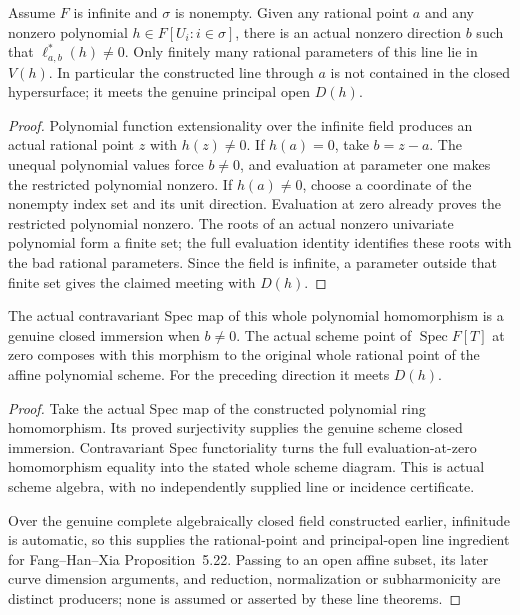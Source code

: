 \begin{theorem}
\label{algebra:affine-line-avoids-polynomial}
\leanok
{}
Assume $F$ is infinite and $\sigma$ is nonempty. Given any rational point
$a$ and any nonzero polynomial $h\in F[U_i:i\in\sigma]$, there is an
actual nonzero direction $b$ such that $\ell_{a,b}^*(h)\ne0$.
Only finitely many rational parameters of this line lie in $V(h)$.
In particular the constructed line through $a$ is not contained in the
closed hypersurface; it meets the genuine principal open $D(h)$.
\end{theorem}
\begin{proof}
Polynomial function extensionality over the infinite field produces an
actual rational point $z$ with $h(z)\ne0$. If $h(a)=0$, take $b=z-a$.
The unequal polynomial values force $b\ne0$, and evaluation at parameter
one makes the restricted polynomial nonzero. If $h(a)\ne0$, choose a
coordinate of the nonempty index set and its unit direction. Evaluation
at zero already proves the restricted polynomial nonzero. The roots of
an actual nonzero univariate polynomial form a finite set; the full
evaluation identity identifies these roots with the bad rational
parameters. Since the field is infinite, a parameter outside that finite
set gives the claimed meeting with $D(h)$.
\end{proof}

\begin{theorem}
\label{scheme:affine-line-closed-immersion}
\leanok
{}
The actual contravariant Spec map of this whole polynomial homomorphism
is a genuine closed immersion when $b\ne0$. The actual scheme point of
$\operatorname{Spec}F[T]$ at zero composes with this morphism to the
original whole rational point of the affine polynomial scheme.
For the preceding direction it meets $D(h)$.
\end{theorem}
\begin{proof}
Take the actual Spec map of the constructed polynomial ring homomorphism.
Its proved surjectivity supplies the genuine scheme closed immersion.
Contravariant Spec functoriality turns the full evaluation-at-zero
homomorphism equality into the stated whole scheme diagram. This is
actual scheme algebra, with no independently supplied line or incidence
certificate.

Over the genuine complete algebraically closed field constructed earlier,
infinitude is automatic, so this supplies the rational-point and
principal-open line ingredient for Fang--Han--Xia Proposition~5.22.
Passing to an open affine subset, its later curve dimension arguments,
and reduction, normalization or subharmonicity are distinct producers;
none is assumed or asserted by these line theorems.
\end{proof}
